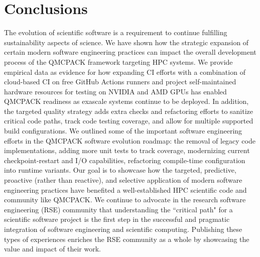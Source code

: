 \section{Conclusions}
\label{sec:Conclusions}

The evolution of scientific software is a requirement to continue fulfilling sustainability aspects of science.
We have shown how the strategic expansion of certain modern software engineering practices can impact the overall development process of the QMCPACK framework targeting HPC systems.
We provide empirical data as evidence for how expanding CI efforts with a combination of cloud-based CI on free GitHub Actions runners and project self-maintained hardware resources for testing on NVIDIA and AMD GPUs has enabled QMCPACK readiness as exascale systems continue to be deployed.
In addition, the targeted quality strategy adds extra checks and refactoring efforts to sanitize critical code paths, track code testing coverage, and allow for multiple supported build configurations.
We outlined some of the important software engineering efforts in the QMCPACK software evolution roadmap: the removal of legacy code implementations, adding more unit tests to track coverage, modernizing current checkpoint-restart and I/O capabilities, refactoring compile-time configuration into runtime variants.
Our goal is to showcase how the targeted, predictive, proactive (rather than reactive), and selective application of modern software engineering practices have benefited a well-established HPC scientific code and community like QMCPACK.
We continue to advocate in the research software engineering (RSE) community that understanding the ``critical path" for a scientific software project is the first step in the successful and pragmatic integration of software engineering and scientific computing.
Publishing these types of experiences enriches the RSE community as a whole by showcasing the value and impact of their work.
